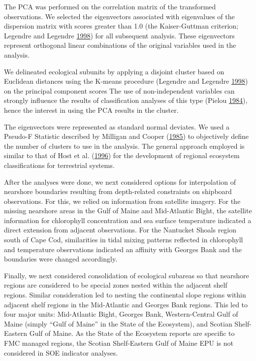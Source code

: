 \documentclass[
]{book}
\begin{document}
The PCA was performed on the correlation matrix of the transformed observations. We selected the eigenvectors associated with eigenvalues of the dispersion matrix with scores greater than 1.0 (the Kaiser-Guttman criterion; Legendre and Legendre \protect\hyperlink{ref-Legendre1998}{1998}) for all subsequent analysis. These eigenvectors represent orthogonal linear combinations of the original variables used in the analysis.

We delineated ecological subunits by applying a disjoint cluster based on Euclidean distances using the K-means procedure (Legendre and Legendre \protect\hyperlink{ref-Legendre1998}{1998}) on the principal component scores The use of non-independent variables can strongly influence the results of classification analyses of this type (Pielou \protect\hyperlink{ref-Pielou1984}{1984}), hence the interest in using the PCA results in the cluster.

The eigenvectors were represented as standard normal deviates. We used a Pseudo-F Statistic described by Milligan and Cooper (\protect\hyperlink{ref-Milligan1985}{1985}) to objectively define the number of clusters to use in the analysis. The general approach employed is similar to that of Host et al. (\protect\hyperlink{ref-Host1996}{1996}) for the development of regional ecosystem classifications for terrestrial systems.

After the analyses were done, we next considered options for interpolation of nearshore boundaries resulting from depth-related constraints on shipboard observations. For this, we relied on information from satellite imagery. For the missing nearshore areas in the Gulf of Maine and Mid-Atlantic Bight, the satellite information for chlorophyll concentration and sea surface temperature indicated a direct extension from adjacent observations. For the Nantucket Shoals region south of Cape Cod, similarities in tidal mixing patterns reflected in chlorophyll and temperature observations indicated an affinity with Georges Bank and the boundaries were changed accordingly.

Finally, we next considered consolidation of ecological subareas so that nearshore regions are considered to be special zones nested within the adjacent shelf regions. Similar consideration led to nesting the continental slope regions within adjacent shelf regions in the Mid-Atlantic and Georges Bank regions. This led to four major units: Mid-Atlantic Bight, Georges Bank, Western-Central Gulf of Maine (simply ``Gulf of Maine'' in the State of the Ecosystem), and Scotian Shelf-Eastern Gulf of Maine. As the State of the Ecosystem reports are specific to FMC managed regions, the Scotian Shelf-Eastern Gulf of Maine EPU is not considered in SOE indicator analyses.
\end{document}
